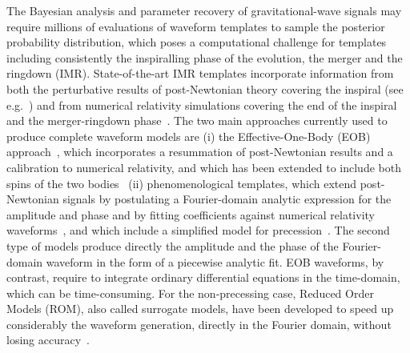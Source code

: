 \documentclass[aps,showpacs,%
prd,superscriptaddress,nofootinbib]{revtex4}
\begin{document}
The Bayesian analysis and parameter recovery of gravitational-wave signals may require millions of evaluations of waveform templates to sample the posterior probability distribution, which poses a computational challenge for templates including consistently the inspiralling phase of the evolution, the merger and the ringdown (IMR). State-of-the-art IMR templates incorporate information from both the perturbative results of post-Newtonian theory covering the inspiral (see e.g.~\cite{BlanchetLiving}) and from numerical relativity simulations covering the end of the inspiral and the merger-ringdown phase~\cite{}. The two main approaches currently used to produce complete waveform models are (i) the Effective-One-Body (EOB) approach~\cite{BD99}, which incorporates a resummation of post-Newtonian results and a calibration to numerical relativity, and which has been extended to include both spins of the two bodies~\cite{Taracchini+13, Pan+13, Bohe+16} (ii) phenomenological templates, which extend post-Newtonian signals by postulating a Fourier-domain analytic expression for the amplitude and phase and by fitting coefficients against numerical relativity waveforms~\cite{Husa+15, Khan+15}, and which include a simplified model for precession~\cite{Hannam+13}. The second type of models produce directly the amplitude and the phase of the Fourier-domain waveform in the form of a piecewise analytic fit. EOB waveforms, by contrast, require to integrate ordinary differential equations in the time-domain, which can be time-consuming. For the non-precessing case, Reduced Order Models (ROM), also called surrogate models, have been developed to speed up considerably the waveform generation, directly in the Fourier domain, without losing accuracy~\cite{Field+13, Puerrer14, Bohe+16}.
\end{document}
